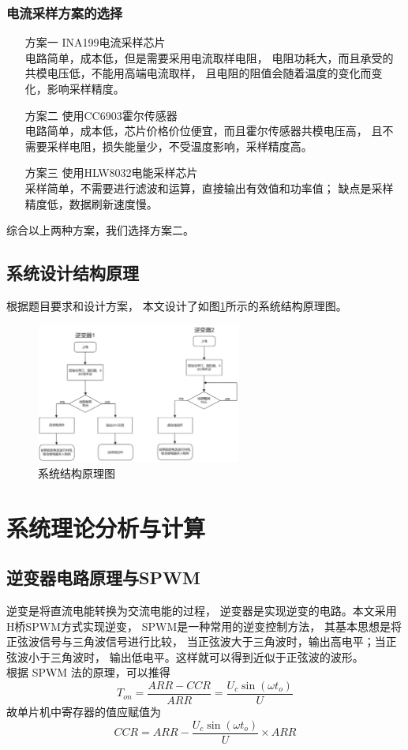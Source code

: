 \documentclass[a4paper,12pt]{article}
\begin{document}
\subsubsection{电流采样方案的选择}
\begin{enumerate}
    \item[方案一] INA199电流采样芯片 
    \\ 
    电路简单，成本低，但是需要采用电流取样电阻，
    电阻功耗大，而且承受的共模电压低，不能用高端电流取样，
    且电阻的阻值会随着温度的变化而变化，影响采样精度。
    \item[方案二] 使用CC6903霍尔传感器 
    \\ 
    电路简单，成本低，芯片价格价位便宜，而且霍尔传感器共模电压高，
    且不需要采样电阻，损失能量少，不受温度影响，采样精度高。
    \item[方案三] 使用HLW8032电能采样芯片  
    \\
    采样简单，不需要进行滤波和运算，直接输出有效值和功率值；
    缺点是采样精度低，数据刷新速度慢。
\end{enumerate}
综合以上两种方案，我们选择方案二。

\subsection{系统设计结构原理}
根据题目要求和设计方案，
本文设计了如图\ref{fig2}所示的系统结构原理图。
\begin{figure}[htbp]
\centering
\includegraphics[width=0.6\textwidth]{src/fig.png}
\caption{系统结构原理图}
\label{fig2}
\end{figure}


\section{系统理论分析与计算}
\subsection{逆变器电路原理与SPWM}
逆变是将直流电能转换为交流电能的过程，
逆变器是实现逆变的电路。本文采用H桥SPWM方式实现逆变，
SPWM是一种常用的逆变控制方法，
其基本思想是将正弦波信号与三角波信号进行比较，
当正弦波大于三角波时，输出高电平；当正弦波小于三角波时，
输出低电平。这样就可以得到近似于正弦波的波形。
\\
根据 SPWM 法的原理，可以推得
\begin{equation*}
T_{on}=\frac{ARR-CCR}{ARR}=\frac{U_c\sin(\omega t_o)}{U}
\end{equation*}
故单片机中寄存器的值应赋值为
\begin{equation*}
CCR=ARR-\frac{U_c\sin (\omega t_o)}{U}\times ARR
\end{equation*}
\end{document}
